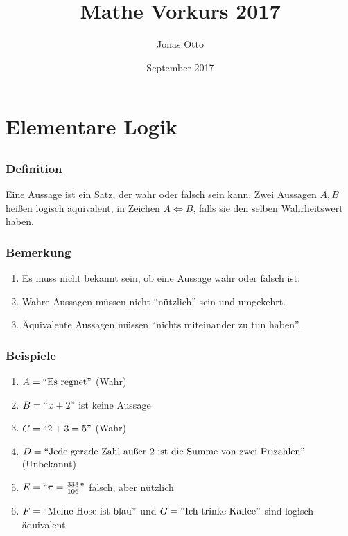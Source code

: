 \documentclass{article}
\title{Mathe Vorkurs 2017}
\author{Jonas Otto}
\date{September 2017}
\begin{document}
\maketitle
\tableofcontents

\section{Elementare Logik}
  \subsection{}
    \subsubsection{Definition}
      Eine Aussage ist ein Satz, der wahr oder falsch sein kann. Zwei Aussagen $A,B$
      heißen logisch äquivalent, in Zeichen $A \iff B$, falls sie den selben
      Wahrheitswert haben.

    \subsubsection{Bemerkung}
      \begin{enumerate}[label=(\roman*)]
        \item Es muss nicht bekannt sein, ob eine Aussage wahr oder falsch ist.
        \item Wahre Aussagen müssen nicht \enquote{nützlich} sein und umgekehrt.
        \item Äquivalente Aussagen müssen \enquote{nichts miteinander zu tun haben}.
      \end{enumerate}

    \subsubsection{Beispiele}
      \begin{enumerate}[label=(\roman*)]
        \item $A = ``\text{Es regnet}"$ (Wahr)
        \item $B = ``x+2"$ ist keine Aussage
        \item $C = ``2+3=5"$ (Wahr)
        \item $D = ``\text{Jede gerade Zahl außer 2 ist die Summe von zwei
        Prizahlen}"$ (Unbekannt)
        \item $E = ``\pi = \frac{333}{106}"$ falsch, aber nützlich
        \item $F = ``\text{Meine Hose ist blau}"$ und
        $G = ``\text{Ich trinke Kaffee}"$ sind logisch äquivalent
      \end{enumerate}
\end{document}
